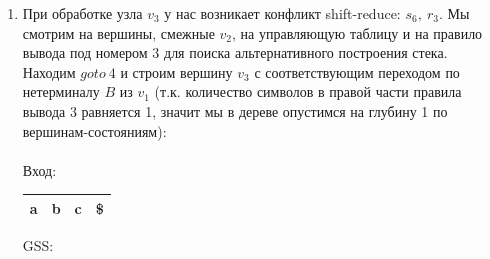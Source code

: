\begin{example}
\begin{enumerate}
\begin{tikzpicture}[x=0.5pt,y=0.5pt,yscale=-1,xscale=1]
        \end{tikzpicture}
        \\

        \item При обработке узла $v_3$ у нас возникает конфликт shift-reduce: $s_6,\ r_3$. Мы смотрим на вершины, смежные $v_2$, на управляющую таблицу и на правило вывода под номером 3 для поиска альтернативного построения стека. Находим $goto\ 4$ и строим вершину $v_3$ с соответствующим переходом по нетерминалу $B$ из $v_1$ (т.к. количество символов в правой части правила вывода 3 равняется 1, значит мы в дереве опустимся на глубину 1 по вершинам-состояниям):\\ \\
        Вход: \,
        \begin{tabular}[c]{ |c|c|c|c| }
            \hline a & b & c & \$ \\ \hline
        \end{tabular}
        \qquad GSS: \,
        \begin{tikzpicture}[x=0.5pt,y=0.5pt,yscale=-1,xscale=1]



\end{tikzpicture}
\end{enumerate}
\end{example}
